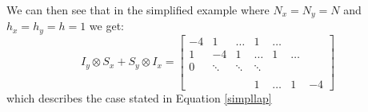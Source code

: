 \documentclass[10pt]{report}
\begin{document}
We can then see that in the simplified example where $N_x = N_y = N$ and $h_x = h_y = h = 1$ we get:
\begin{equation*}
    I_y \otimes S_x + S_y \otimes I_x = \begin{bmatrix}
        -4&1&\hdots&1&\hdots\\
        1&-4&1&\hdots&1&\hdots\\
        0 &\ddots&\ddots &\ddots \\\\
        &&&1&\hdots&1&-4
    \end{bmatrix}
\end{equation*}
which describes the case stated in Equation \ref{simpllap}
\end{document}
